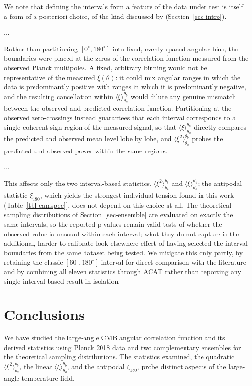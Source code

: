 \documentclass[apj,twocolumn,numberedappendix]{openjournal}
\begin{document}
We note that defining the intervals from a feature of the data under
test is itself a form of a posteriori choice, of the kind discussed by
\citet{Efstathiou_2010} (Section~\ref{sec-intro}).

...

Rather than partitioning $[0^\circ,180^\circ]$ into fixed, evenly spaced angular bins, the boundaries were placed at the zeros of the correlation function measured from the observed Planck multipoles.
A fixed, arbitrary binning would not be representative of the measured $\xi(\theta)$: it could mix angular ranges in which the data is predominantly positive with ranges in which it is predominantly negative, and the resulting cancellation within $\langle\xi\rangle_{\theta_a}^{\theta_b}$ would dilute any genuine mismatch between the observed and predicted correlation function.
Partitioning at the observed zero-crossings instead guarantees that each interval corresponds to a single coherent sign region of the measured signal, so that $\langle\xi\rangle_{\theta_a}^{\theta_b}$ directly compares the predicted and observed mean level lobe by lobe, and $\langle\xi^2\rangle_{\theta_a}^{\theta_b}$ probes the predicted and observed power within the same regions.

...

This
affects only the two interval-based statistics,
$\langle\xi^2\rangle_{\theta_a}^{\theta_b}$ and
$\langle\xi\rangle_{\theta_a}^{\theta_b}$; the antipodal statistic
$\xi_{180}$, which yields the strongest individual tension found in this
work (Table~\ref{tbl-camspec}), does not depend on this
choice at all. The theoretical sampling distributions of
Section~\ref{sec-ensemble} are evaluated on exactly the
same intervals, so the reported p-values remain valid tests of whether
the observed value is unusual within each interval; what they do not
capture is the additional, harder-to-calibrate look-elsewhere effect of
having selected the interval boundaries from the same dataset being
tested. We mitigate this only partly, by retaining the classic
$[60^\circ,180^\circ]$ interval for direct comparison with the
literature and by combining all eleven statistics through ACAT rather
than reporting any single interval-based result in isolation.


\section{Conclusions}\label{sec-conclusions}

We have studied the large-angle CMB angular correlation function and its
derived statistics using Planck 2018 data and two complementary
ensembles for the theoretical sampling distributions. The statistics
examined, the quadratic $\langle\xi^2\rangle_{\theta_a}^{\theta_b}$, the linear
$\langle\xi\rangle_{\theta_a}^{\theta_b}$, and the antipodal
$\xi_{180}$, probe distinct aspects of the large-angle temperature
field.
\end{document}
